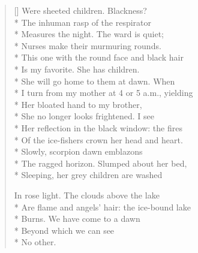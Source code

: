 \begin{verse}[\versewidth]
Were sheeted children. Blackness?\\*
The inhuman rasp of the respirator\\*
Measures the night. The ward is quiet;\\*
Nurses make their murmuring rounds.\\*
This one with the round face and black hair\\*
Is my favorite. She has children.\\*
She will go home to them at dawn. When\\*
I turn from my mother at 4 or 5 a.m., yielding\\*
Her bloated hand to my brother,\\*
She no longer looks frightened. I see\\*
Her reflection in the black window: the fires\\*
Of the ice-fishers crown her head and heart.\\*
Slowly, scorpion dawn emblazons\\*
The ragged horizon. Slumped about her bed,\\*
Sleeping, her grey children are washed

In rose light. The clouds above the lake\\*
Are flame and angels' hair: the ice-bound lake\\*
Burns. We have come to a dawn\\*
Beyond which we can see\\*
No other.
\end{verse}
